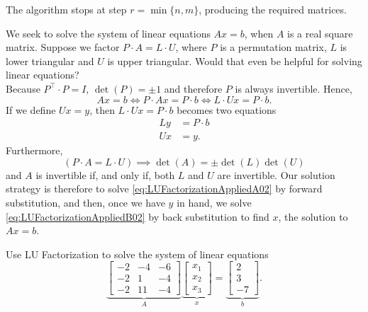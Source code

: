 The algorithm stops at step $r=\min\{n,m\}$, producing the required matrices. 

\Qed

\begin{tcolorbox}[title=\textbf{\large Solving $\mathbf{Ax=b}$  via LU Factorization}]
We seek to solve the system of linear equations $Ax=b$, when $A$ is a real square matrix. Suppose we factor $P \cdot A=L \cdot U$, where $P$ is a permutation matrix, $L$ is lower triangular and $U$ is upper triangular. Would that even be helpful for solving linear equations? \\

Because $P^\top \cdot P = I$, $\det(P) = \pm 1$ and therefore $P$ is always invertible. Hence, 
 $$Ax = b \iff P \cdot A x = P \cdot b \iff L \cdot U x = P \cdot b. $$
If we define $Ux=y$, then $L \cdot U x = P \cdot b$ becomes two equations
\begin{align}
  \label{eq:LUFactorizationAppliedA02}
  L y &= P\cdot b \\
    \label{eq:LUFactorizationAppliedB02}
 U x &=y.
\end{align}
Furthermore,  
$$ (P \cdot A=L \cdot U) \implies \det(A) = \pm \det(L) \det(U)$$ and $A$ is invertible if, and only if, both $L$ and $U$ are invertible. Our solution strategy is therefore to solve \eqref{eq:LUFactorizationAppliedA02} by forward substitution, and then, once we have $y$ in hand, we solve \eqref{eq:LUFactorizationAppliedB02}
by back substitution to find $x$, the solution to $Ax=b$.
\end{tcolorbox}

\begin{example}
\label{ex:SolveUsingLu01WithPerm} 
Use LU Factorization to solve the system of linear equations
\begin{equation}
    \label{eq:Chap5pt4AwithPerm}
\underbrace{\left[\begin{array}{rrr} -2 & -4 & -6\\
-2 & 1 & -4 \\ -2 & 11 & -4 \end{array}\right]}_{A}  \underbrace{\left[\begin{array}{r} x_1\\
x_2 \\ x_3\end{array}\right]}_{x} 
= \underbrace{\left[\begin{array}{r} 2\\
3 \\ -7 \end{array}\right]}_{b}. 
\end{equation}
\end{example}

